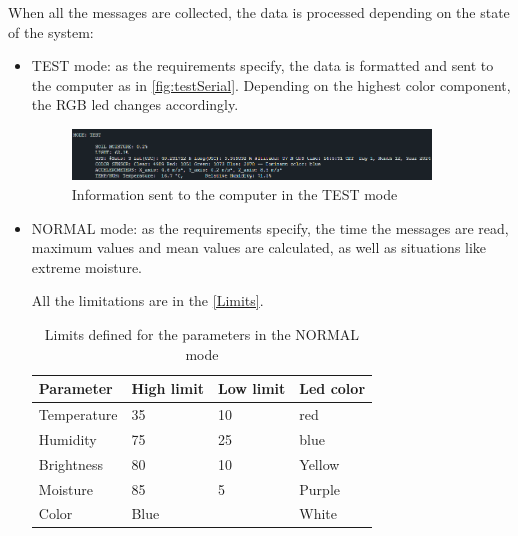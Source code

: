 When all the messages are collected, the data is processed depending on the state of the system:
\begin{itemize}
    \item TEST mode: as the requirements specify, the data is formatted and sent to the computer as in \autoref{fig:testSerial}. Depending on the highest color component, the RGB led changes accordingly.
    \begin{figure}[H]
        \centering
        \includegraphics[width=0.9\textwidth]{images/4/TestSerial.png}
        \caption{Information sent to the computer in the TEST mode}
        \label{fig:testSerial}
    \end{figure}
    \clearpage
    \item NORMAL mode: as the requirements specify, the time the messages are read, maximum values and mean values are calculated, as well as situations like extreme moisture.
    
    All the limitations are in the \autoref{Limits}.

    \begin{table}[H]
        \begin{center}
            \begin{tabular}{|p{} | p{} | p{}| p{}|}
                \hline
                \textbf{Parameter} & \textbf{High limit} & \textbf{Low limit} & \textbf{Led color}\\
                \hline
                Temperature & 35 & 10 & red \\
                \hline
                Humidity & 75 & 25 & blue \\
                \hline
                Brightness & 80 & 10 & Yellow \\
                \hline
                Moisture & 85 & 5 & Purple \\
                \hline
                Color & Blue &  & White \\
                \hline
            \end{tabular}
        \end{center}
        \caption{Limits defined for the parameters in the NORMAL mode}
        \label{Limits}
    \end{table}


\end{itemize}
